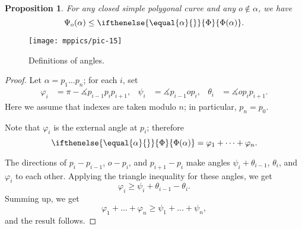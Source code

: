 \documentclass{article}
\theoremstyle{theorem}
\newtheorem{Proposition}[theorem]{Proposition}
\newtheorem{Crofton-type formula}[theorem]{Crofton-type formula}
\newtheorem{Douglas--Rado theorem}[theorem]{Douglas--Rado theorem}
\newtheorem{Extended monotonicity theorem}[theorem]{Extended monotonicity theorem}
\theoremstyle{definition}
\newcommand*{\tc}[1]{\ifthenelse{\equal{#1}{}}{\Phi}{\Phi({#1})}}%
\def\phi{\varphi}
\begin{document}
\begin{Proposition}\label{prop:angular-length}
For any closed simple polygonal curve and any $o\notin\alpha$, we have 
\[\Psi_o(\alpha)\le \tc{\alpha}.\]
\end{Proposition}

\begin{figure}[!ht]
\vskip-0mm
\centering
\texttt{[image: mppics/pic-15]}
\caption{Definitions of angles.}
\vskip0mm
\end{figure}

\begin{proof}
Let $\alpha=p_1\dots p_n$; for each $i$, set 
\begin{align*}
\phi_i&=\pi-\measuredangle p_{i-1}p_ip_{i+1},
&
\psi_i&=\measuredangle p_{i-1} o p_{i},
&
\theta_i&=\measuredangle o p_i p_{i+1}.
\end{align*}
Here we assume that indexes are taken modulo $n$; in particular, $p_{n}=p_0$.

Note that $\phi_i$ is the external angle at $p_i$;
therefore 
\[\tc\alpha= \phi_1+\dots+\phi_n.\]

The directions of $p_i-p_{i-1}$, $o-p_i$, and $p_{i+1}-p_i$ make angles 
$\psi_i+\theta_{i-1}$, $\theta_i$, and $\phi_i$ to each other.
Applying the triangle inequality for these angles, we get
\[\phi_i\ge \psi_i+\theta_{i-1}-\theta_i.\]
Summing up, we get
\[\phi_1+\dots+\phi_n\ge \psi_1+\dots+\psi_n,\]
and the result follows.
\end{proof}
\end{document}
